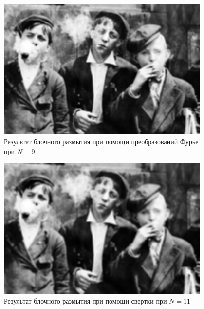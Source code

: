 \begin{figure}[ht!]
    \centering
    \includegraphics[width=0.95\textwidth]{images/result/task_2/Averaging_fourier_9.png}
    \caption{Результат блочного размытия при помощи преобразований Фурье при $N=9$}
    \label{fig:av_f_9}
\end{figure}

\begin{figure}[ht!]
    \centering
    \includegraphics[width=0.95\textwidth]{images/result/task_2/Averaging_11.png}
    \caption{Результат блочного размытия при помощи свертки при $N=11$}
    \label{fig:av_c_11}
\end{figure}

